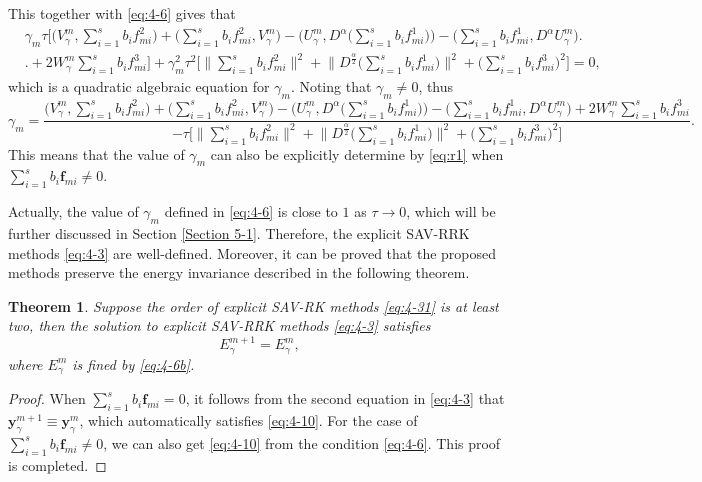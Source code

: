 \documentclass[preprint,compress,3p,10pt,fleqn]{elsarticle}
\numberwithin{equation}{section}
\newtheorem{theorem}{Theorem}[section]
\begin{document}
This together with \eqref{eq:4-6} gives that
\begin{align*}
&\gamma_m\tau\big[\big(V_{\gamma}^{m},\sum\limits_{i=1}^{s}b_if_{mi}^2\big)+\big(\sum\limits_{i=1}^{s}b_if_{mi}^2,V_{\gamma}^{m}\big)-\big(U_{\gamma}^{m},D^{\alpha} \big(\sum\limits_{i=1}^{s}b_if_{mi}^1\big)\big)-\big(\sum\limits_{i=1}^{s}b_if_{mi}^1, D^{\alpha} U_{\gamma}^{m}\big)\big.\\
&\big.+2W_{\gamma}^{m}\sum\limits_{i=1}^{s}b_if_{mi}^3\big] +\gamma_m^2\tau^2\big[\big\|\sum\limits_{i=1}^{s}b_if_{mi}^2\big\|^2+ \big\|D^\frac{\alpha}{2}\big(\sum\limits_{i=1}^{s}b_if_{mi}^1\big)\big\|^2+\big(\sum\limits_{i=1}^{s}b_if_{mi}^3\big)^2\big]=0,
\end{align*}
which is a quadratic algebraic equation for $\gamma_m$. Noting that $\gamma_m \neq 0$, thus
\begin{equation}\label{eq:r1}
\gamma_m\!=\!\frac{\big(V_{\gamma}^{m},\sum\limits_{i=1}^{s}b_if_{mi}^2\big)\!+\!\big(\sum\limits_{i=1}^{s}b_if_{mi}^2,V_{\gamma}^{m}\big)\!-\!\big(U_{\gamma}^{m},
D^{\alpha}\!\big(\sum\limits_{i=1}^{s}b_if_{mi}^1\big)\big)\!-\!\big(\sum\limits_{i=1}^{s}b_if_{mi}^1, D^{\alpha} U_{\gamma}^{m}\big)\!+\!2W_{\gamma}^{m}\sum\limits_{i=1}^{s}b_if_{mi}^3}{-\tau\big[\big\|\sum\limits_{i=1}^{s}b_if_{mi}^2\big\|^2\!+ \! \big\|D^\frac{\alpha}{2}\big(\sum\limits_{i=1}^{s}b_if_{mi}^1\big)\big\|^2\!+\!\big(\sum\limits_{i=1}^{s}b_if_{mi}^3\big)^2\big]} .
\end{equation}
This means that the value of $\gamma_m$ can also be explicitly determine by \eqref{eq:r1} when $\sum\limits_{i=1}^s b_i \bm{f}_{m i}\neq 0$.
	
Actually, the value of $\gamma_m$ defined in \eqref{eq:4-6} is close to $1$ as $\tau\rightarrow 0$,
which will be further discussed in Section \ref{Section 5-1}. Therefore, the explicit SAV-RRK methods \eqref{eq:4-3} are well-defined. Moreover, it can be proved that the proposed methods preserve the energy invariance described in the following theorem.
\begin{theorem}
	Suppose the order of explicit SAV-RK methods \eqref{eq:4-31} is at least two, then the solution to explicit SAV-RRK methods \eqref{eq:4-3} satisfies
\begin{equation}
E_{\gamma}^{m+1}=E_{\gamma}^{m}, \label{eq:4-10}
\end{equation}
where $E_{\gamma}^{m}$ is fined by \eqref{eq:4-6b}.
\end{theorem}

\begin{proof}
When $\sum\limits_{i=1}^s b_i \bm{f}_{m i}=0$, it follows from the second equation in \eqref{eq:4-3} that $\bm{y}_\gamma^{m+1}\equiv\bm{y}_\gamma^m$, which automatically satisfies \eqref{eq:4-10}. For the case of $\sum\limits_{i=1}^s b_i \bm{f}_{m i}\neq 0$, we can also get \eqref{eq:4-10} from the condition \eqref{eq:4-6}. This proof is completed.
\end{proof}
	
\end{document}
